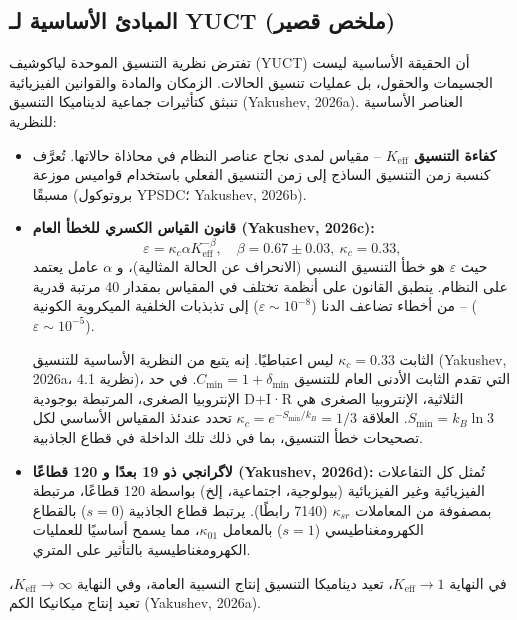 \documentclass[11pt,a4paper]{article}
\newcommand{\Keff}{K_{\mathrm{eff}}}
\newcommand{\eps}{\varepsilon}
\newcommand{\kappac}{\kappa_c}
\newcommand{\constmin}{C_{\min}}
\begin{document}
	\subsection{المبادئ الأساسية لـ YUCT (ملخص قصير)}
	\label{subsec:yuct-core}
	
	تفترض نظرية التنسيق الموحدة لياكوشيف (YUCT) أن الحقيقة الأساسية ليست الجسيمات والحقول، بل عمليات تنسيق الحالات. الزمكان والمادة والقوانين الفيزيائية تنبثق كتأثيرات جماعية لديناميكا التنسيق (Yakushev, 2026a). العناصر الأساسية للنظرية:
	\begin{itemize}
		\item \textbf{كفاءة التنسيق $\Keff$} – مقياس لمدى نجاح عناصر النظام في محاذاة حالاتها. تُعرَّف كنسبة زمن التنسيق الساذج إلى زمن التنسيق الفعلي باستخدام قواميس موزعة مسبقًا (بروتوكول YPSDC؛ Yakushev, 2026b).
		\item \textbf{قانون القياس الكسري للخطأ العام (Yakushev, 2026c):}
		\begin{equation}
			\eps = \kappac \alpha \Keff^{-\beta}, \quad \beta = 0.67 \pm 0.03, \ \kappac = 0.33,
			\label{eq:universal-scaling}
		\end{equation}
		حيث $\eps$ هو خطأ التنسيق النسبي (الانحراف عن الحالة المثالية)، و $\alpha$ عامل يعتمد على النظام. ينطبق القانون على أنظمة تختلف في المقياس بمقدار 40 مرتبة قدرية – من أخطاء تضاعف الدنا ($\eps\sim 10^{-8}$) إلى تذبذبات الخلفية الميكروية الكونية ($\eps\sim 10^{-5}$).
		
		الثابت $\kappac = 0.33$ ليس اعتباطيًا. إنه يتبع من النظرية الأساسية للتنسيق (Yakushev, 2026a، نظرية 4.1)، التي تقدم الثابت الأدنى العام للتنسيق $\constmin = 1 + \delta_{\min}$. في حد الإنتروبيا الصغرى، المرتبطة بوجودية D+I·R الثلاثية، الإنتروبيا الصغرى هي $S_{\min} = k_B \ln 3$. العلاقة $\kappac = e^{-S_{\min}/k_B} = 1/3$ تحدد عندئذ المقياس الأساسي لكل تصحيحات خطأ التنسيق، بما في ذلك تلك الداخلة في قطاع الجاذبية.
		
		\item \textbf{لاگرانجي ذو 19 بعدًا و 120 قطاعًا (Yakushev, 2026d):} تُمثل كل التفاعلات الفيزيائية وغير الفيزيائية (بيولوجية، اجتماعية، إلخ) بواسطة 120 قطاعًا، مرتبطة بمصفوفة من المعاملات $\kappa_{sr}$ (7140 رابطًا). يرتبط قطاع الجاذبية ($s=0$) بالقطاع الكهرومغناطيسي ($s=1$) بالمعامل $\kappa_{01}$، مما يسمح أساسيًا للعمليات الكهرومغناطيسية بالتأثير على المتري.
	\end{itemize}
	في النهاية $\Keff \to 1$، تعيد ديناميكا التنسيق إنتاج النسبية العامة، وفي النهاية $\Keff \to \infty$، تعيد إنتاج ميكانيكا الكم (Yakushev, 2026a).
	
\end{document}
